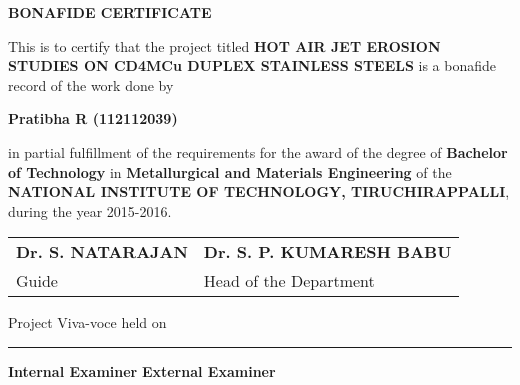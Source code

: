 \thispagestyle{plain}
\begin{center}
\textbf{BONAFIDE CERTIFICATE}
\end{center}

\vspace{0.3cm}
\fontsize{12pt}{18pt}\selectfont This is to certify that the project titled \textbf{HOT AIR JET EROSION STUDIES ON CD4MCu DUPLEX STAINLESS STEELS} is a bonafide record of the work done by
\vspace{0.3cm}

\begin{center}
\textbf{Pratibha R (112112039)}
\end{center}

\vspace{0.3cm}
\noindent
\fontsize{12pt}{18pt}\selectfont in partial fulfillment of the requirements for the award of the degree of \textbf{Bachelor of Technology} in \textbf{Metallurgical and Materials Engineering} of the \textbf{NATIONAL INSTITUTE OF TECHNOLOGY, TIRUCHIRAPPALLI}, during the year 2015-2016.

\vspace{3cm}

\begin{tabu} to \textwidth { X[l] X[c] }

 \textbf{Dr. S. NATARAJAN} & \textbf{Dr. S. P. KUMARESH BABU} \\ \hspace{1cm} Guide & Head of the Department

\end{tabu}

\vspace{4cm}
Project Viva-voce held on \rule{5.5cm}{.1pt}

\vspace{4cm}
\textbf{Internal Examiner} \hfill \textbf{External Examiner}

\newpage
